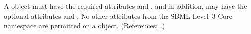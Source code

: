 A \Trigger object must have the required attributes
 and , and in addition, may have the
optional attributes  and .  No other
attributes from the SBML Level~3 Core namespace are permitted on a \Trigger
object.  (References: .)
